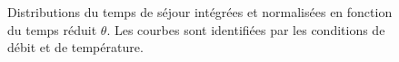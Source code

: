 \begin{figure}[h]
  \centering
  \hfill

  \caption{\label{fig:residence_time_distribution_integrated}Distributions du temps de séjour intégrées et normalisées en fonction du temps réduit $\theta$. Les courbes sont identifiées par les conditions de débit et de température.}
\end{figure}

